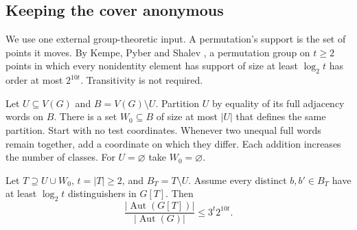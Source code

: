 \subsection{Keeping the cover anonymous}

We use one external group-theoretic input. A permutation's support is
the set of points it moves. By Kempe, Pyber and Shalev
\cite[Theorem~A(2)]{KPS2007}, a permutation group on $t\ge2$ points
in which every nonidentity element has support of size at least
$\log_2 t$ has order at most $2^{10t}$. Transitivity is not required.

Let $U\subseteq V(G)$ and $B=V(G)\setminus U$. Partition $U$ by equality
of its full adjacency words on $B$. There is a set $W_0\subseteq B$ of
size at most $|U|$ that defines the same partition. Start with no test
coordinates. Whenever two unequal full words remain together, add a
coordinate on which they differ. Each addition increases the number of
classes. For $U=\varnothing$ take $W_0=\varnothing$.

\begin{lemma}\label{geo:virtual}
Let $T\supseteq U\cup W_0$, $t=|T|\ge2$, and $B_T=T\setminus U$.
Assume every distinct $b,b'\in B_T$ have at least $\log_2 t$
distinguishers in $G[T]$. Then
\begin{equation}
 \frac{|\operatorname{Aut}(G[T])|}{|\operatorname{Aut}(G)|}
 \le 3^t 2^{10t}.
 \label{geo:quotient}
\end{equation}
\end{lemma}

